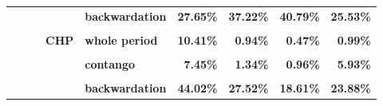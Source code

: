 \documentclass[
  authoryear,
  preprint,
  3p]{elsarticle}
\begin{document}
\begin{landscape}
\begin{longtable}[t]{>{}l>{}l>{}l>{}l>{}l>{}r>{}r>{}r>{}r}
\textbf{} & \textbf{} & \textbf{} & \textbf{} & \textbf{backwardation} & \textcolor[HTML]{4285f4}{\textbf{27.65\%}} & \textcolor[HTML]{4285f4}{\textbf{37.22\%}} & \textcolor[HTML]{4285f4}{\textbf{40.79\%}} & \textcolor[HTML]{4285f4}{\textbf{25.53\%}}\\
\textbf{\cellcolor{gray!10}{}} & \textbf{\cellcolor{gray!10}{}} & \textbf{\cellcolor{gray!10}{}} & \textbf{\cellcolor{gray!10}{}} & \textbf{\cellcolor{gray!10}{contango}} & \textcolor[HTML]{4285f4}{\textbf{\cellcolor{gray!10}{30.08\%}}} & \textcolor[HTML]{4285f4}{\textbf{\cellcolor{gray!10}{35.26\%}}} & \textcolor[HTML]{4285f4}{\textbf{\cellcolor{gray!10}{52.9\%}}} & \textcolor[HTML]{4285f4}{\textbf{\cellcolor{gray!10}{35.71\%}}}\\
\textbf{} & \textbf{} & \textbf{} & \textbf{CHP} & \textbf{whole period} & \textcolor[HTML]{4285f4}{\textbf{10.41\%}} & \textcolor[HTML]{4285f4}{\textbf{0.94\%}} & \textcolor[HTML]{4285f4}{\textbf{0.47\%}} & \textcolor[HTML]{4285f4}{\textbf{0.99\%}}\\
\addlinespace
\textbf{\cellcolor{gray!10}{}} & \textbf{\cellcolor{gray!10}{}} & \textbf{\cellcolor{gray!10}{}} & \textbf{\cellcolor{gray!10}{}} & \textbf{\cellcolor{gray!10}{backwardation}} & \textcolor[HTML]{4285f4}{\textbf{\cellcolor{gray!10}{13.69\%}}} & \textcolor[HTML]{4285f4}{\textbf{\cellcolor{gray!10}{0.63\%}}} & \textcolor[HTML]{4285f4}{\textbf{\cellcolor{gray!10}{0.15\%}}} & \textcolor[HTML]{4285f4}{\textbf{\cellcolor{gray!10}{1.14\%}}}\\
\textbf{} & \textbf{} & \textbf{} & \textbf{} & \textbf{contango} & \textcolor[HTML]{4285f4}{\textbf{7.45\%}} & \textcolor[HTML]{4285f4}{\textbf{1.34\%}} & \textcolor[HTML]{4285f4}{\textbf{0.96\%}} & \textcolor[HTML]{4285f4}{\textbf{5.93\%}}\\
\textbf{\cellcolor{gray!10}{}} & \textbf{\cellcolor{gray!10}{}} & \textbf{\cellcolor{gray!10}{}} & \textbf{\cellcolor{gray!10}{open interest}} & \textbf{\cellcolor{gray!10}{whole period}} & \textcolor[HTML]{4285f4}{\textbf{\cellcolor{gray!10}{45.97\%}}} & \textcolor[HTML]{4285f4}{\textbf{\cellcolor{gray!10}{35.46\%}}} & \textcolor[HTML]{4285f4}{\textbf{\cellcolor{gray!10}{23.06\%}}} & \textcolor[HTML]{4285f4}{\textbf{\cellcolor{gray!10}{31.56\%}}}\\
\textbf{} & \textbf{} & \textbf{} & \textbf{} & \textbf{backwardation} & \textcolor[HTML]{4285f4}{\textbf{44.02\%}} & \textcolor[HTML]{4285f4}{\textbf{27.52\%}} & \textcolor[HTML]{4285f4}{\textbf{18.61\%}} & \textcolor[HTML]{4285f4}{\textbf{23.88\%}}\\

\end{longtable}
\end{landscape}
\end{document}
